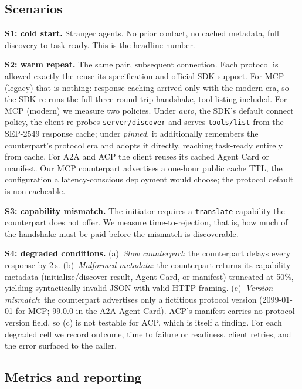 \documentclass[10pt]{article}
\newcommand{\mcpl}{MCP (legacy)}
\newcommand{\mcpm}{MCP (modern)}
\newcommand{\code}[1]{\mbox{\texttt{#1}}}
\begin{document}
\subsection{Scenarios}

\textbf{S1: cold start.} Stranger agents. No prior contact, no cached
metadata, full discovery to task-ready. This is the headline number.

\textbf{S2: warm repeat.} The same pair, subsequent connection. Each
protocol is allowed exactly the reuse its specification and official SDK
support. For \mcpl{} that is nothing: response caching arrived only with
the modern era, so the SDK re-runs the full three-round-trip handshake,
tool listing included. For \mcpm{} we measure two policies. Under
\emph{auto}, the SDK's default connect policy, the client re-probes
\code{server/discover} and serves \code{tools/list} from the SEP-2549
response cache; under \emph{pinned}, it additionally remembers the
counterpart's protocol era and adopts it directly, reaching task-ready
entirely from cache. For A2A and ACP the client reuses its cached Agent
Card or manifest. Our MCP counterpart advertises a one-hour public cache
TTL, the configuration a latency-conscious deployment would choose; the
protocol default is non-cacheable.

\textbf{S3: capability mismatch.} The initiator requires a
\code{translate} capability the counterpart does not offer. We measure
time-to-rejection, that is, how much of the handshake must be paid before
the mismatch is discoverable.

\textbf{S4: degraded conditions.} (a)~\emph{Slow counterpart}: the
counterpart delays every response by 2\,s. (b)~\emph{Malformed metadata}:
the counterpart returns its capability metadata (initialize/discover
result, Agent Card, or manifest) truncated at 50\%, yielding
syntactically invalid JSON with valid HTTP framing. (c)~\emph{Version
mismatch}: the counterpart advertises only a fictitious protocol version
(2099-01-01 for MCP; 99.0.0 in the A2A Agent Card). ACP's manifest
carries no protocol-version field, so (c) is not testable for ACP, which
is itself a finding. For each degraded cell we record outcome, time to
failure or readiness, client retries, and the error surfaced to the
caller.

\subsection{Metrics and reporting}
\end{document}
